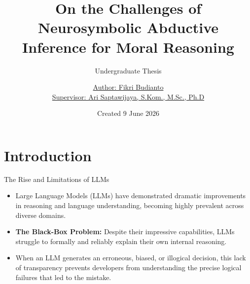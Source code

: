 \documentclass{beamer}
\title{On the Challenges of Neurosymbolic Abductive Inference
for Moral Reasoning}
\subtitle{Undergraduate Thesis}
\author{\href{mailto:fikri.budianto@ui.ac.id}{Author: Fikri Budianto \\
Supervisor: Ari Saptawijaya, S.Kom., M.Sc., Ph.D}}
\date{Created 9 June 2026}
\begin{document}
    \maketitle




    \section{Introduction}

    \begin{frame}{The Rise and Limitations of LLMs}
        \begin{itemize}
            \item Large Language Models (LLMs) have demonstrated dramatic improvements in reasoning and language understanding, becoming highly prevalent across diverse domains.
            \item \textbf{The Black-Box Problem:} Despite their impressive capabilities, LLMs struggle to formally and reliably explain their own internal reasoning.
            \item When an LLM generates an erroneous, biased, or illogical decision, this lack of transparency prevents developers from understanding the precise logical failures that led to the mistake.
        \end{itemize}
    \end{frame}
\end{document}
